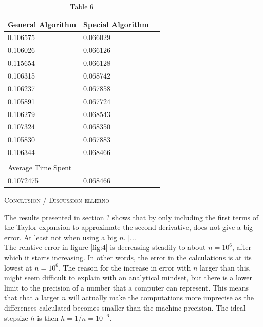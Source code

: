 \documentclass[a4paper,10pt]{article}
\begin{document}
\begin{table}[]
\begin{tabular}{lll}
\hline
General Algorithm  & Special Algorithm \\
\hline
0.106575           & 0.066029                       \\
0.106026           & 0.066126                       \\
0.115654           & 0.066128                       \\
0.106315           & 0.068742                       \\
0.106237           & 0.067858                       \\
0.105891           & 0.067724                       \\
0.106279           & 0.068543                       \\
0.107324           & 0.068350                        \\
0.105830           & 0.067883                        \\
0.106344           & 0.068466                        \\
                   &                   &                  \\\hline
Average Time Spent &                                \\
\hline
0.1072475          & 0.068466                      
\end{tabular}
\label{fig:6}
\caption{Table 6}
\end{table}


\begin{center}
\textsc{Conclusion / Discussion ellerno}
\end{center}
The results presented in section ? shows that by only including the first terms of the Taylor expansion to approximate the second derivative, does not give a big error. At least not when using a big $n$.  [...] \\


The relative error in figure \ref{fig:4} is decreasing steadily to about $n = 10^6$, after which it starts increasing. In other words, the error in the calculations is at its lowest at $n=10^6$. The reason for the increase in error with $n$ larger than this, might seem difficult to explain with an analytical mindset, but there is a lower limit to the precision of a number that a computer can represent. This means that that a larger $n$ will actually make the computations more imprecise as the differences calculated becomes smaller than the machine precision. The ideal stepsize $h$ is then $h = 1/n = 10^{-6}$. \\
\end{document}
